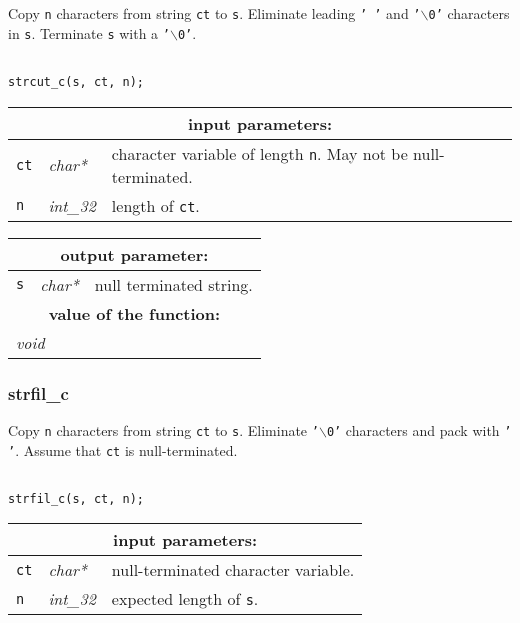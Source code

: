 Copy {\tt n} characters from string {\tt ct} to {\tt s}. Eliminate leading {\tt ' '} and {\tt '}$\backslash${\tt 0'}
characters in {\tt s}. Terminate {\tt s} with a {\tt '}$\backslash${\tt 0'}.

\begin{verbatim}

strcut_c(s, ct, n);
\end{verbatim}

\vskip 0.8cm

\noindent
\begin{tabular}{|p{1.5cm}|p{2cm}|p{11cm}|}
\hline
\multicolumn{3}{|c|}{\bf input parameters:} \\
\hline
{\tt ct} & {\it char*} & character variable of length {\tt n}. May not be null-terminated.\\
\hline
{\tt n} & {\it int\_32} & length of {\tt ct}. \\
\hline
\end{tabular}

\vskip 0.8cm

\noindent
\begin{tabular}{|p{1.5cm}|p{2cm}|p{11cm}|}
\hline
\multicolumn{3}{|c|}{\bf output parameter:} \\
\hline
{\tt s} & {\it char*} & null terminated string. \\
\hline
\multicolumn{3}{|c|}{\bf value of the function:} \\
\hline
\multicolumn{2}{|l|}{\it void} &  \\
\hline
\end{tabular}

\subsubsection{strfil\_c}

Copy {\tt n} characters from string {\tt ct} to {\tt s}. Eliminate {\tt '}$\backslash${\tt 0'} characters and
pack with {\tt ' '}. Assume that {\tt ct} is null-terminated.

\begin{verbatim}

strfil_c(s, ct, n);
\end{verbatim}

\vskip 0.8cm

\noindent
\begin{tabular}{|p{1.5cm}|p{2cm}|p{11cm}|}
\hline
\multicolumn{3}{|c|}{\bf input parameters:} \\
\hline
{\tt ct} & {\it char*} & null-terminated character variable.\\
\hline
{\tt n} & {\it int\_32} & expected length of {\tt s}. \\
\hline
\end{tabular}

